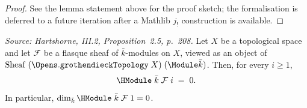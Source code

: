 \begin{proof}
  See the lemma statement above for the proof sketch; the formalisation
  is deferred to a future iteration after a Mathlib \(j_!\)
  construction is available.
\end{proof}

\begin{theorem}

  \label{thm:H1_vanishing_flasque}
  \textit{Source: Hartshorne, III.2, Proposition~2.5, p.~208.}
  Let \(X\) be a topological space and let \(\mathcal F\) be a flasque
  sheaf of \(\bar k\)-modules on \(X\), viewed as an object of
  \(\mathrm{Sheaf}\;(\Opens.\mathtt{grothendieckTopology}\;X)\;
  (\Module \bar k)\). Then, for every \(i \ge 1\),
  \[
    \HModule\;\bar k\;\mathcal F\;i \;=\; 0.
  \]
  In particular, \(\dim_{\bar k} \HModule\;\bar k\;\mathcal F\;1 = 0\).
\end{theorem}

